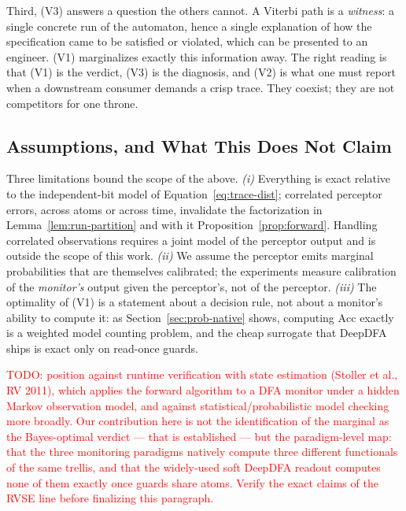 Third, (V3) answers a question the others cannot. A Viterbi path is a \emph{witness}: a single concrete run of the automaton, hence a single explanation of how the specification came to be satisfied or violated, which can be presented to an engineer. (V1) marginalizes exactly this information away. The right reading is that (V1) is the verdict, (V3) is the diagnosis, and (V2) is what one must report when a downstream consumer demands a crisp trace. They coexist; they are not competitors for one throne.

\subsection{Assumptions, and What This Does Not Claim}
\label{sec:prob-assumptions}

Three limitations bound the scope of the above. \emph{(i)} Everything is exact relative to the independent-bit model of Equation~\eqref{eq:trace-dist}; correlated perceptor errors, across atoms or across time, invalidate the factorization in Lemma~\ref{lem:run-partition} and with it Proposition~\ref{prop:forward}. Handling correlated observations requires a joint model of the perceptor output and is outside the scope of this work. \emph{(ii)} We assume the perceptor emits marginal probabilities that are themselves calibrated; the experiments measure calibration of the \emph{monitor's} output given the perceptor's, not of the perceptor. \emph{(iii)} The optimality of (V1) is a statement about a decision rule, not about a monitor's ability to compute it: as Section~\ref{sec:prob-native} shows, computing $\mathrm{Acc}$ exactly is a weighted model counting problem, and the cheap surrogate that DeepDFA ships is exact only on read-once guards.

\textcolor{red}{TODO: position against runtime verification with state estimation (Stoller et al., RV 2011), which applies the forward algorithm to a DFA monitor under a hidden Markov observation model, and against statistical/probabilistic model checking more broadly. Our contribution here is not the identification of the marginal as the Bayes-optimal verdict --- that is established --- but the paradigm-level map: that the three monitoring paradigms natively compute three different functionals of the same trellis, and that the widely-used soft DeepDFA readout computes none of them exactly once guards share atoms. Verify the exact claims of the RVSE line before finalizing this paragraph.}
